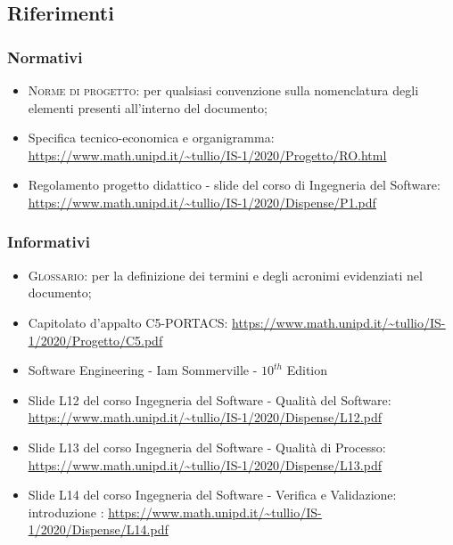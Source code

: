 \subsection{Riferimenti}

\subsubsection{Normativi}

\begin{itemize}
	\item \textsc{Norme di progetto}: per qualsiasi convenzione sulla nomenclatura degli elementi presenti all’interno del documento;
	\item Specifica tecnico-economica e organigramma: \newline  \uline{\url{https://www.math.unipd.it/~tullio/IS-1/2020/Progetto/RO.html}} 
	\item Regolamento progetto didattico - slide del corso di Ingegneria del Software: \newline \uline{\url{https://www.math.unipd.it/~tullio/IS-1/2020/Dispense/P1.pdf}}
\end{itemize}

\subsubsection{Informativi}
\begin{itemize}
	\item \textsc{Glossario}: per la definizione dei termini e degli acronimi evidenziati nel documento;
	\item Capitolato d'appalto C5-PORTACS: \newline
	\uline{\url{https://www.math.unipd.it/~tullio/IS-1/2020/Progetto/C5.pdf}}
	\item Software Engineering - Iam Sommerville - $10^{th}$ Edition
\item Slide L12 del corso Ingegneria del Software - Qualità del Software:\newline
\uline{\url{https://www.math.unipd.it/~tullio/IS-1/2020/Dispense/L12.pdf}}
\item Slide L13 del corso Ingegneria del Software - Qualità di Processo:\newline
\uline{\url{https://www.math.unipd.it/~tullio/IS-1/2020/Dispense/L13.pdf}}
\item Slide L14 del corso Ingegneria del Software - Verifica e Validazione: introduzione :\newline
\uline{\url{https://www.math.unipd.it/~tullio/IS-1/2020/Dispense/L14.pdf}}
\end{itemize}